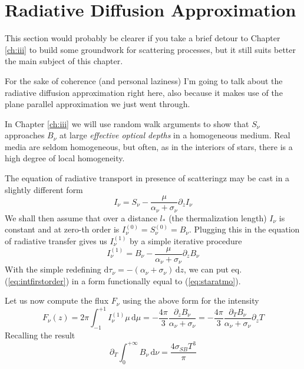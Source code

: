 \section*{Radiative Diffusion Approximation}
This section would probably be clearer if you take a brief detour to Chapter \ref{ch:iii} to build some groundwork for scattering processes, but it still suits better the main subject of this chapter.
\par For the sake of coherence (and personal laziness) I'm going to talk about the radiative diffusion approximation right here, also because it makes use of the plane parallel approximation we just went through.
\par In Chapter \ref{ch:iii} we will use random walk arguments to show that $S_{\nu}$ approaches $B_{\nu}$ at large \emph{effective optical depths} in a homogeneous medium. Real media are seldom homogeneous, but often, as in the interiors of stars, there is a high degree of local homogeneity. 
\par The equation of radiative transport in presence of scatteringz may be cast in a slightly different form 
\begin{equation*}
	I_{\nu} = S_{\nu}-\frac{\mu}{\alpha_{\nu}+\sigma_{\nu}}\partial_{z}I_{\nu}
\end{equation*}
We shall then assume that over a distance $l_{*}$ (the thermalization length) $I_{\nu}$ is constant and at zero-th order is $I_{\nu}^{(0)}=S_{\nu}^{(0)} = B_{\nu}$. Plugging this in the equation of radiative transfer gives us $I_{\nu}^{(1)}$ by a simple iterative procedure
\begin{equation}
	I_{\nu}^{(1)} = B_{\nu} -\frac{\mu}{\alpha_{\nu}+\sigma_{\nu}}\partial_{z}B_{\nu}
	\label{eq:intfirstorder}
\end{equation}
With the simple redefining $\text{d}\tau_{\nu} = -(\alpha_{\nu}+\sigma_{\nu})\,\text{d}z$, we can put eq.(\ref{eq:intfirstorder}) in a form functionally equal to (\ref{eq:staratmo}).
\par Let us now compute the flux $F_{\nu}$ using the above form for the intensity
\begin{equation*}
	F_{\nu}(z) = 2\pi\int_{-1}^{+1} I_{\nu}^{(1)}\mu\,\text{d}\mu = -\frac{4\pi}{3}\frac{\partial_{z}B_{\nu}}{\alpha_{\nu}+\sigma_{\nu}} = -\frac{4\pi}{3}\frac{\partial_{T}B_{\nu}}{\alpha_{\nu}+\sigma_{\nu}}\partial_{z}T
\end{equation*}
Recalling the result
\begin{equation*}
	\partial_{T}\int_{0}^{+\infty}B_{\nu}\,\text{d}\nu = \frac{4\sigma_{SB}T^{3}}{\pi}
\end{equation*}
